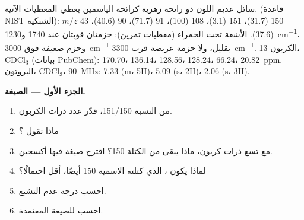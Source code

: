 \begin{problem}
\label{pb:b2:structure-determination:1}
سائل عديم اللون ذو رائحة زهرية كرائحة الياسمين يعطي المعطيات الآتية.  (قاعدة NIST
الشبكية): $m/z$ 150 (31.7)، 151 (3.1)، 108 (100)، 91 (71.7)، 90 (40.6)، 43 (37.6). الأشعة تحت الحمراء (معطيات
تمرين): حزمتان قويتان عند 1740 و\qty{1230}{cm^{-1}}، وحزم ضعيفة فوق \qty{3000}{cm^{-1}} بقليل، ولا
حزمة عريضة قرب \qty{3300}{cm^{-1}}. الكربون-13، CDCl$_3$ (بيانات PubChem): 170.70، 136.14، 128.56،
128.24، 66.24، 20.82~ppm. البروتون، CDCl$_3$، \qty{90}{MHz}: 7.33 (m، 5H)، 5.09 (s، 2H)، 2.06 (s، 3H).

\begin{center}
\end{center}

\medskip
\noindent\textbf{الجزء الأول --- الصيغة.}
\begin{enumerate}
  \item من النسبة 151/150، قدّر عدد ذرات الكربون.
  \item ماذا تقول ؟
  \item مع تسع ذرات كربون، ماذا يبقى من الكتلة 150؟ اقترح صيغة فيها أكسجين.
  \item لماذا يكون ، الذي كتلته الاسمية 150 أيضًا، أقل احتمالًا؟
  \item احسب درجة عدم التشبع.
  \item احسب  للصيغة المعتمدة.
\end{enumerate}


\end{problem}
